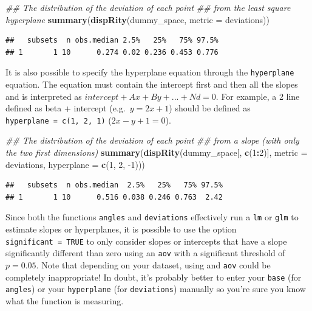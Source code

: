 \documentclass[
]{book}
\newenvironment{Shaded}{\begin{snugshade}}{\end{snugshade}}
\newcommand{\CommentTok}[1]{\textcolor[rgb]{0.56,0.35,0.01}{\textit{#1}}}
\newcommand{\DataTypeTok}[1]{\textcolor[rgb]{0.13,0.29,0.53}{#1}}
\newcommand{\DecValTok}[1]{\textcolor[rgb]{0.00,0.00,0.81}{#1}}
\newcommand{\KeywordTok}[1]{\textcolor[rgb]{0.13,0.29,0.53}{\textbf{#1}}}
\newcommand{\NormalTok}[1]{#1}
\newcommand{\OperatorTok}[1]{\textcolor[rgb]{0.81,0.36,0.00}{\textbf{#1}}}
\begin{document}
\begin{Shaded}
\begin{Highlighting}[]
\CommentTok{\#\# The distribution of the deviation of each point}
\CommentTok{\#\# from the least square hyperplane}
\KeywordTok{summary}\NormalTok{(}\KeywordTok{dispRity}\NormalTok{(dummy\_space, }\DataTypeTok{metric =}\NormalTok{ deviations))}
\end{Highlighting}
\end{Shaded}

\begin{verbatim}
##   subsets  n obs.median 2.5%   25%   75% 97.5%
## 1       1 10      0.274 0.02 0.236 0.453 0.776
\end{verbatim}

It is also possible to specify the hyperplane equation through the \texttt{hyperplane} equation. The equation must contain the intercept first and then all the slopes and is interpreted as \(intercept + Ax + By + ... + Nd = 0\). For example, a 2 line defined as beta + intercept (e.g.~\(y = 2x + 1\)) should be defined as \texttt{hyperplane\ =\ c(1,\ 2,\ 1)} (\(2x - y + 1 = 0\)).

\begin{Shaded}
\begin{Highlighting}[]
\CommentTok{\#\# The distribution of the deviation of each point}
\CommentTok{\#\# from a slope (with only the two first dimensions)}
\KeywordTok{summary}\NormalTok{(}\KeywordTok{dispRity}\NormalTok{(dummy\_space[, }\KeywordTok{c}\NormalTok{(}\DecValTok{1}\OperatorTok{:}\DecValTok{2}\NormalTok{)], }\DataTypeTok{metric =}\NormalTok{ deviations,}
                 \DataTypeTok{hyperplane =} \KeywordTok{c}\NormalTok{(}\DecValTok{1}\NormalTok{, }\DecValTok{2}\NormalTok{, }\DecValTok{{-}1}\NormalTok{)))}
\end{Highlighting}
\end{Shaded}

\begin{verbatim}
##   subsets  n obs.median  2.5%   25%   75% 97.5%
## 1       1 10      0.516 0.038 0.246 0.763  2.42
\end{verbatim}

Since both the functions \texttt{angles} and \texttt{deviations} effectively run a \texttt{lm} or \texttt{glm} to estimate slopes or hyperplanes, it is possible to use the option \texttt{significant\ =\ TRUE} to only consider slopes or intercepts that have a slope significantly different than zero using an \texttt{aov} with a significant threshold of \(p = 0.05\).
Note that depending on your dataset, using and \texttt{aov} could be completely inappropriate!
In doubt, it's probably better to enter your \texttt{base} (for \texttt{angles}) or your \texttt{hyperplane} (for \texttt{deviations}) manually so you're sure you know what the function is measuring.
\end{document}
